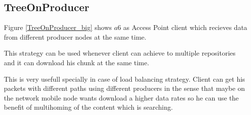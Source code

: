 \subsection{TreeOnProducer}
Figure \ref{TreeOnProducer_big} shows $a6$ as Access Point client which recieves data from different producer nodes at the same time.

This strategy can be used whenever client can achieve to multiple repositories and it can download his chunk at the same time.

This is very usefull specially in case of load balancing strategy. Client can get his packets with different paths using different producers in the sense that maybe on the network mobile node wants download a higher data rates so he can use the benefit of multihoming of the content which is searching.

